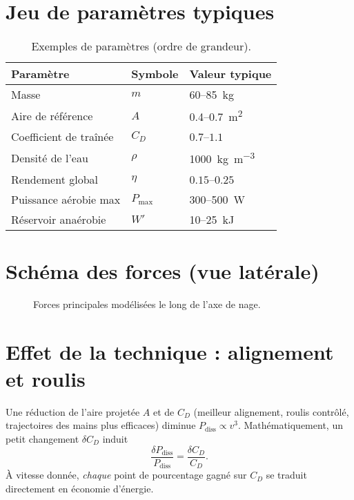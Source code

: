 \documentclass[12pt,a4paper]{article}
\begin{document}
\section{Jeu de paramètres typiques}
\begin{table}[h]
 \centering
 \caption{Exemples de paramètres (ordre de grandeur).}
 \label{tab:param}
 \begin{tabular}{@{}lll@{}}
  \toprule
  Paramètre & Symbole & Valeur typique \\
  \midrule
  Masse & $m$ & \SI{60}{}--\SI{85}{kg} \\
  Aire de référence & $A$ & \SI{0.4}{}--\SI{0.7}{m^2} \\
  Coefficient de traînée & $C_D$ & $0.7$--$1.1$ \\
  Densité de l'eau & $\rho$ & \SI{1000}{kg.m^{-3}} \\
  Rendement global & $\eta$ & $0.15$--$0.25$ \\
  Puissance aérobie max & $P_{\max}$ & \SI{300}{}--\SI{500}{W} \\
  Réservoir anaérobie & $W'$ & \SI{10}{}--\SI{25}{kJ} \\
  \bottomrule
 \end{tabular}
\end{table}

\section{Schéma des forces (vue latérale)}
\begin{figure}[h]
 \centering
 \caption{Forces principales modélisées le long de l'axe de nage.}
\end{figure}

\section{Effet de la technique : alignement et roulis}
Une réduction de l'aire projetée $A$ et de $C_D$ (meilleur alignement, roulis contrôlé, trajectoires des mains plus efficaces) diminue $P_{\mathrm{diss}}\propto v^3$. Mathématiquement, un petit changement $\delta C_D$ induit
\begin{equation}
 \frac{\delta P_{\mathrm{diss}}}{P_{\mathrm{diss}}} = \frac{\delta C_D}{C_D}.
 \end{equation}
À vitesse donnée, \emph{chaque} point de pourcentage gagné sur $C_D$ se traduit directement en économie d'énergie.
\end{document}

